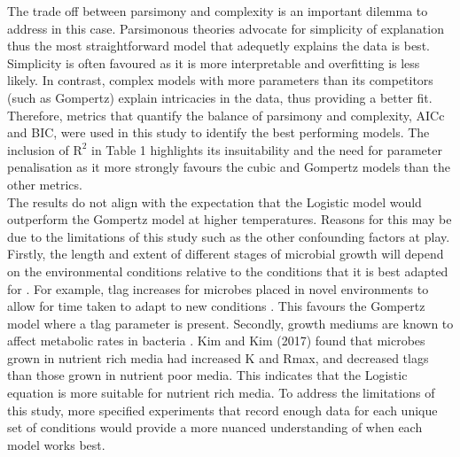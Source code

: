 \documentclass[12pt]{article}
\begin{document}
The trade off between parsimony and complexity is an important dilemma to address in this case. Parsimonous theories advocate for simplicity of explanation \cite{Coelho2019} thus the most straightforward model that adequetly explains the data is best. Simplicity is often favoured as it is more interpretable and overfitting is less likely. In contrast, complex models with more parameters than its competitors (such as Gompertz) explain intricacies in the data, thus providing a better fit. Therefore, metrics that quantify the balance of parsimony and complexity, AICc and BIC, were used in this study to identify the best performing models. The inclusion of $\mathrm{R}^2$ in Table 1 highlights its insuitability and the need for parameter penalisation as it more strongly favours the cubic and Gompertz models than the other metrics.\\

The results do not align with the expectation that the Logistic model would outperform the Gompertz model at higher temperatures. Reasons for this may be due to the limitations of this study such as the other confounding factors at play. Firstly, the length and extent of different stages of microbial growth will depend on the environmental conditions relative to the conditions that it is best adapted for \cite{Dey2020}. For example, tlag increases for microbes placed in novel environments to allow for time taken to adapt to new conditions \cite{Rolfe2012}. This favours the Gompertz model where a tlag parameter is present. Secondly, growth mediums are known to affect metabolic rates in bacteria \cite{KIM201764}. Kim and Kim (2017) found that microbes grown in nutrient rich media had increased K and Rmax, and decreased tlags than those grown in nutrient poor media. This indicates that the Logistic equation is more suitable for nutrient rich media. To address the limitations of this study, more specified experiments that record enough data for each unique set of conditions would provide a more nuanced understanding of when each model works best.\\
\end{document}
